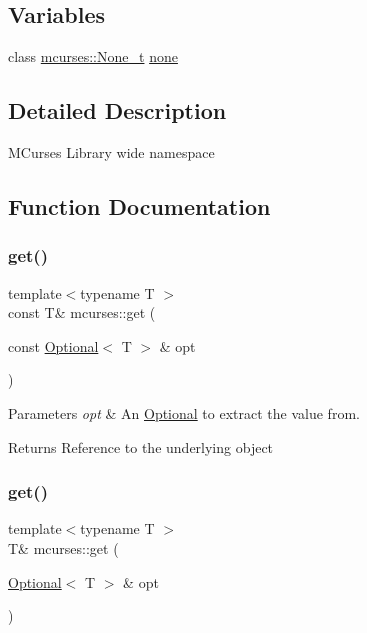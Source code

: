 \subsection*{Variables}
\begin{DoxyCompactItemize}
\item 
class \hyperlink{classmcurses_1_1None__t}{mcurses\+::\+None\+\_\+t} \hyperlink{namespacemcurses_a3fd18c73e6d453dcdfdd1fcdaf9bb0d7}{none}
\end{DoxyCompactItemize}


\subsection{Detailed Description}
M\+Curses Library wide namespace 

\subsection{Function Documentation}
\hypertarget{namespacemcurses_aecfab040ad7ea9b1d5cf9ea4994431e0}{}\label{namespacemcurses_aecfab040ad7ea9b1d5cf9ea4994431e0} 
\subsubsection{\texorpdfstring{get()}{get()}\hspace{0.1cm}{\footnotesize\ttfamily [1/4]}}
{\footnotesize\ttfamily template$<$typename T $>$ \\
const T\& mcurses\+::get (\begin{DoxyParamCaption}\item[{const \hyperlink{classmcurses_1_1Optional}{Optional}$<$ T $>$ \&}]{opt }\end{DoxyParamCaption})}


\begin{DoxyParams}{Parameters}
{\em opt} & An \hyperlink{classmcurses_1_1Optional}{Optional} to extract the value from. \\
\hline
\end{DoxyParams}
\begin{DoxyReturn}{Returns}
Reference to the underlying object 
\end{DoxyReturn}
\hypertarget{namespacemcurses_a67fa46298482b4f9f0d4d9af2fc57737}{}\label{namespacemcurses_a67fa46298482b4f9f0d4d9af2fc57737} 
\subsubsection{\texorpdfstring{get()}{get()}\hspace{0.1cm}{\footnotesize\ttfamily [2/4]}}
{\footnotesize\ttfamily template$<$typename T $>$ \\
T\& mcurses\+::get (\begin{DoxyParamCaption}\item[{\hyperlink{classmcurses_1_1Optional}{Optional}$<$ T $>$ \&}]{opt }\end{DoxyParamCaption})}


